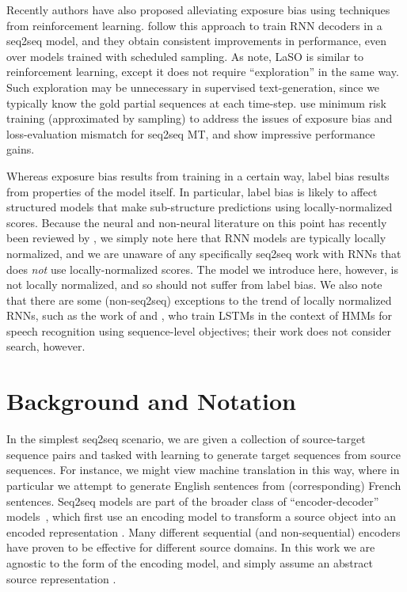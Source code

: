 \documentclass[11pt,letterpaper]{article}
\begin{document}
Recently authors have also proposed alleviating exposure bias using
techniques from reinforcement learning. 
 follow this approach to train RNN decoders
in a seq2seq model, and they obtain consistent improvements in performance, even over models trained with scheduled sampling. As  note, LaSO is similar to reinforcement learning, except
it does not require ``exploration'' in the same
way. Such exploration may be unnecessary in supervised text-generation, since we typically know the
gold partial sequences at each time-step.  use minimum risk training (approximated by sampling) to address the issues of exposure bias and loss-evaluation mismatch for seq2seq MT, and show impressive performance gains.

Whereas exposure bias results from training in a certain way, label
bias results from properties of the model itself. In particular, label
bias is likely to affect structured models that make sub-structure
predictions using locally-normalized scores. Because the neural and
non-neural literature on this point has recently been reviewed by
, we simply note here that RNN
models are typically locally normalized, and we are unaware of any
specifically seq2seq work with RNNs that does \textit{not} use
locally-normalized scores. The model we introduce here, however, is
not locally normalized, and so should not suffer from label bias. We
also note that there are some (non-seq2seq) exceptions to the trend of
locally normalized RNNs, such as the work of 
and , who train LSTMs in the context
of HMMs for speech recognition using sequence-level objectives; their
work does not consider search, however.

%
 
\section{Background and Notation}
\label{sec:background}
In the simplest seq2seq scenario, we are given a collection of source-target
sequence pairs and tasked with learning to generate
target sequences from source sequences. For instance, we might view machine translation in this way, where in particular we attempt to generate English sentences from (corresponding) French sentences. Seq2seq models are part of the broader class of ``encoder-decoder'' models~\cite{cho14on}, which first use an encoding model to transform a source object into an encoded representation . Many different sequential
(and non-sequential) encoders have proven to be effective for
different source domains. In this work we are agnostic to the
form of the encoding model, and simply assume an abstract source
representation . 
\end{document}
